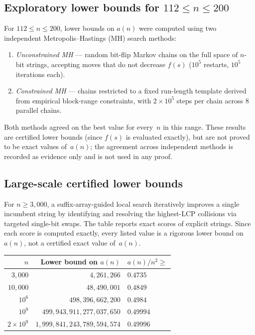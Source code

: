 \documentclass[11pt,a4paper]{article}
\theoremstyle{plain}
\theoremstyle{definition}
\theoremstyle{remark}
\begin{document}
\subsection{Exploratory lower bounds for \texorpdfstring{$112 \le n \le 200$}{112 <= n <= 200}}

For $112 \le n \le 200$, lower bounds on $a(n)$ were computed using
two independent Metropolis--Hastings (MH) search methods:
\begin{enumerate}[nosep]
  \item \emph{Unconstrained MH} --- random bit-flip Markov chains on
    the full space of $n$-bit strings, accepting moves that do not
    decrease $f(s)$ ($10^5$ restarts, $10^5$ iterations each).
  \item \emph{Constrained MH} --- chains restricted to a fixed
    run-length template derived from empirical block-range
    constraints, with $2 \times 10^5$ steps per chain across $8$
    parallel chains.
\end{enumerate}
Both methods agreed on the best value for every~$n$ in this range.
These results are certified lower bounds (since $f(s)$ is evaluated
exactly), but are not proved to be exact values of~$a(n)$; the
agreement across independent methods is recorded as evidence only and
is not used in any proof.

\subsection{Large-scale certified lower bounds}

For $n \ge 3{,}000$, a suffix-array-guided local search
iteratively improves a single incumbent string by identifying and
resolving the highest-LCP collisions via targeted single-bit swaps.
The table reports exact scores of explicit strings.  Since each score
is computed exactly, every listed value is a rigorous lower bound
on~$a(n)$, not a certified exact value of~$a(n)$.

\begin{center}
\begin{tabular}{rrl}
  \toprule
  $n$ & Lower bound on $a(n)$ & $a(n)/n^2 \ge$ \\
  \midrule
  $3{,}000$            & $4{,}261{,}266$                          & $0.4735$ \\
  $10{,}000$           & $48{,}490{,}001$                         & $0.4849$ \\
  $10^6$               & $498{,}396{,}662{,}200$                  & $0.4984$ \\
  $10^9$               & $499{,}943{,}911{,}277{,}037{,}650$      & $0.49994$ \\
  $2 \times 10^9$      & $1{,}999{,}841{,}243{,}789{,}594{,}574$  & $0.49996$ \\
  \bottomrule
\end{tabular}
\end{center}
\end{document}
